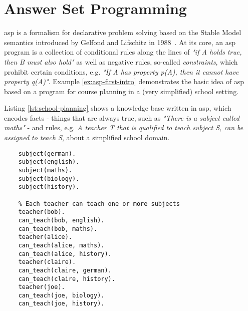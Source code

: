 \section{Answer Set Programming}

\gls{asp} is a formalism for declarative problem solving based on the Stable Model semantics introduced by Gelfond and Lifschitz in 1988~\cite{stable-models}. At its core, an \gls{asp} program is a collection of conditional rules along the lines of \emph{"if A holds true, then B must also hold"} as well as negative rules, so-called \emph{constraints}, which prohibit certain conditions, e.g. \emph{"If A has property p(A), then it cannot have property q(A)"}. Example \ref{ex:asp-first-intro} demonstrates the basic idea of \gls{asp} based on a program for course planning in a (very simplified) school setting.
\begin{example}
\label{ex:asp-first-intro}
Listing \ref{lst:school-planning} shows a knowledge base written in \gls{asp}, which encodes facts - things that are always true, such as \emph{"There is a subject called maths"} - and rules, e.g. \emph{A teacher T that is qualified to teach subject S, can be assigned to teach S}, about a simplified school domain.
\begin{lstlisting}[style=asp-code, caption=School planning in ASP, label={lst:school-planning}]
    % The curriculum consists of different courses.
    subject(german).
    subject(english).
    subject(maths).
    subject(biology).
    subject(history).

    % Each teacher can teach one or more subjects
    teacher(bob).
    can_teach(bob, english).
    can_teach(bob, maths).
    teacher(alice).
    can_teach(alice, maths).
    can_teach(alice, history).
    teacher(claire).
    can_teach(claire, german).
    can_teach(claire, history).
    teacher(joe).
    can_teach(joe, biology).
    can_teach(joe, history).


\end{lstlisting}
\end{example}
